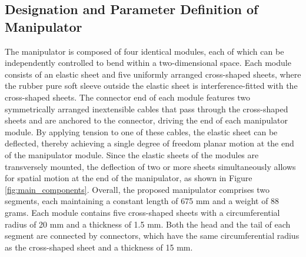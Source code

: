 \subsection{Designation and Parameter Definition of Manipulator}
The manipulator is composed of four identical modules, each of which can be independently controlled to bend within a 
two-dimensional space. Each module consists of an elastic sheet and five uniformly arranged cross-shaped sheets, where 
the rubber pure soft sleeve outside the elastic sheet is interference-fitted with the cross-shaped sheets. The connector 
end of each module features two symmetrically arranged inextensible cables that pass through the cross-shaped sheets and 
are anchored to the connector, driving the end of each manipulator module. By applying tension to one of these cables, 
the elastic sheet can be deflected, thereby achieving a single degree of freedom planar motion at the end of the 
manipulator module. Since the elastic sheets of the modules are transversely mounted, the deflection of two or more 
sheets simultaneously allows for spatial motion at the end of the manipulator, as shown in Figure \ref{fig:main_components}. 
Overall, the proposed manipulator comprises two segments, each maintaining a constant length of 675 mm and a weight of 
88 grams. Each module contains five cross-shaped sheets with a circumferential radius of 20 mm and a thickness of 1.5 mm. 
Both the head and the tail of each segment are connected by connectors, which have the same circumferential radius as 
the cross-shaped sheet and a thickness of 15 mm.

